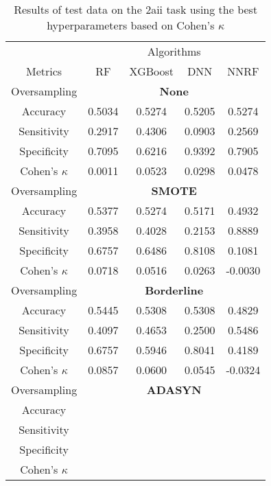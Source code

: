 \begin{table}[!htb]
\centering
\caption{Results of test data on the 2aii task using the best hyperparameters based on Cohen's $\kappa$}
\label{tab:2aii_test_results}
\begin{tabular}{c | c c c c}
\hline
 & \multicolumn{4}{c}{Algorithms}\\ 
Metrics &RF & XGBoost & DNN & NNRF\\ 
\hline
Oversampling &\multicolumn{4}{|c}{\textbf{None}}\\ 
\hline
Accuracy & 0.5034 & 0.5274 & 0.5205 & 0.5274\\ 
Sensitivity & 0.2917 & 0.4306 & 0.0903 & 0.2569\\ 
Specificity & 0.7095 & 0.6216 & 0.9392 & 0.7905\\ 
Cohen's $\kappa$ & 0.0011 & 0.0523 & 0.0298 & 0.0478\\ 
\hline
Oversampling &\multicolumn{4}{|c}{\textbf{SMOTE}}\\ 
\hline
Accuracy & 0.5377 & 0.5274 & 0.5171 & 0.4932\\ 
Sensitivity & 0.3958 & 0.4028 & 0.2153 & 0.8889\\ 
Specificity & 0.6757 & 0.6486 & 0.8108 & 0.1081\\ 
Cohen's $\kappa$ & 0.0718 & 0.0516 & 0.0263 & -0.0030\\ 
\hline
Oversampling &\multicolumn{4}{|c}{\textbf{Borderline}}\\ 
\hline
Accuracy & 0.5445 & 0.5308 & 0.5308 & 0.4829\\ 
Sensitivity & 0.4097 & 0.4653 & 0.2500 & 0.5486\\ 
Specificity & 0.6757 & 0.5946 & 0.8041 & 0.4189\\ 
Cohen's $\kappa$ & 0.0857 & 0.0600 & 0.0545 & -0.0324\\ 
\hline
Oversampling &\multicolumn{4}{|c}{\textbf{ADASYN}}\\ 
\hline
Accuracy &  &  &  & \\ 
Sensitivity &  &  &  & \\ 
Specificity &  &  &  & \\ 
Cohen's $\kappa$ &  &  &  & \\ 
\hline
\end{tabular}
\end{table}

